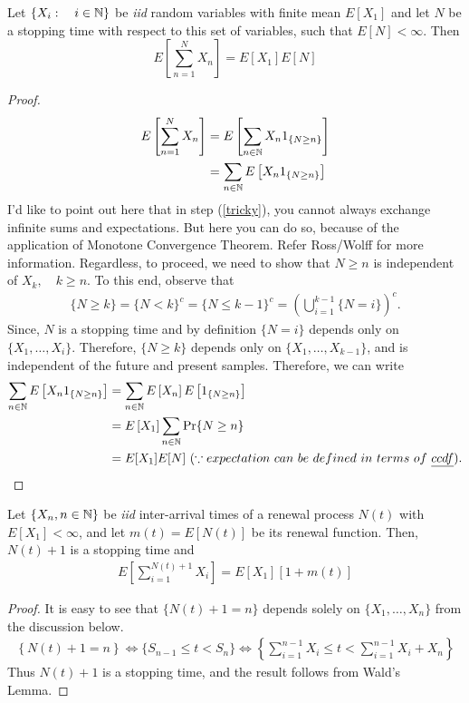 \documentclass[a4paper,10pt, english]{article}
\begin{document}
\begin{lem}
	Let $\{X_i:\quad i\in \mathbb{N}\}$ be \emph{iid} random variables with finite mean $E[X_1]$ and let $N$ be a stopping time with respect to this set of variables, such that $E[N] < \infty$. Then
	\[E\left[\sum_{n=1}^N X_n\right] = E[X_1]E[N]\]
\end{lem}
\begin{proof}
	\begin{align}
	E\left[\sum_{n=1}^N X_n\right] &= E\left[\sum_{n \in \mathbb{N}} X_n 1_{\{N \geq n\}}\right]  \\
	&= \sum_{n \in \mathbb{N}} E\left[X_n 1_{\{N \geq n\}}\right] \label{tricky}
	\end{align}
	I'd like to point out here that in step (\ref{tricky}), you cannot always exchange infinite sums and expectations. But here you can do so, because of the application of Monotone Convergence Theorem. Refer Ross/Wolff for more information. Regardless, to proceed, we need to show that $N \geq n$ is independent of $X_k, \quad k \geq n$. To this end, observe that 
	\begin{align*}
	\{N \geq k\} = \{N < k\}^c = \{N \leq k-1\}^c = \left(\bigcup_{i=1}^{k-1} \{N = i\}\right)^c. 
	\end{align*}
	Since, $N$ is a stopping time and by definition $\{N=i\}$ depends only on $\{X_1,\ldots, X_i\}$. Therefore, $\{N \geq k\}$ depends only on $\{X_1,\ldots, X_{k-1}\}$, and is independent of the future and present samples. Therefore, we can write
	\begin{align*}
	\sum_{n \in \mathbb{N}} E\left[X_n 1_{\{N \geq n\}}\right] &= \sum_{n \in \mathbb{N}} E\left[X_n\right]E\left[ 1_{\{N \geq n\}}\right] \\
	&= E\left[X_1\right] \sum_{n \in \mathbb{N}} \Pr\{N \geq n\} \\
	&= E[X_1]E[N] ~(\because expectation~can~be~defined~ in~ terms~ of~ \emph{ccdf}).
	\end{align*} 
\end{proof}

\begin{prop} \label{prop:WaldRenewal}
	Let $\{X_n, n \in \mathbb{N}\}$ be \emph{iid} inter-arrival times of a renewal process $N(t)$ with $E[X_1] < \infty$, and let $m(t) = E[N(t)]$ be its renewal function. Then, $N(t)+1$ is a stopping time and 
	\begin{align*}
	E\left[\sum_{i=1}^{N(t)+1}X_i\right] = E[X_1][1+m(t)]
	\end{align*}
\end{prop}
\begin{proof} It is easy to see that $\{N(t)+1=n\}$ depends solely on $\{X_1,\ldots,X_n\}$ from the discussion below.
	\begin{align*}
	\left\{N(t) + 1 = n \right\} \iff \{S_{n-1} \leq t < S_n\} \iff \left\{\sum_{i=1}^{n-1} X_i \leq t < \sum_{i=1}^{n-1} X_i + X_n\right\}
	\end{align*}
	Thus $N(t)+1$ is a stopping time, and the result follows from Wald's Lemma.
\end{proof}
\end{document}
